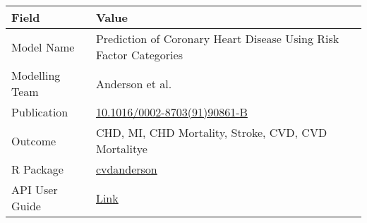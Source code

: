 \documentclass[
]{book}
\begin{document}
\begin{longtable}[]{@{}ll@{}}
\toprule
\begin{minipage}[b]{0.45\columnwidth}\raggedright
Field\strut
\end{minipage} & \begin{minipage}[b]{0.49\columnwidth}\raggedright
Value\strut
\end{minipage}\tabularnewline
\midrule
\endhead
\begin{minipage}[t]{0.45\columnwidth}\raggedright
Model Name\strut
\end{minipage} & \begin{minipage}[t]{0.49\columnwidth}\raggedright
Prediction of Coronary Heart Disease Using Risk Factor Categories\strut
\end{minipage}\tabularnewline
\begin{minipage}[t]{0.45\columnwidth}\raggedright
Modelling Team\strut
\end{minipage} & \begin{minipage}[t]{0.49\columnwidth}\raggedright
Anderson et al.\strut
\end{minipage}\tabularnewline
\begin{minipage}[t]{0.45\columnwidth}\raggedright
Publication\strut
\end{minipage} & \begin{minipage}[t]{0.49\columnwidth}\raggedright
\href{https://doi.org/10.1016/0002-8703(91)90861-B}{10.1016/0002-8703(91)90861-B}\strut
\end{minipage}\tabularnewline
\begin{minipage}[t]{0.45\columnwidth}\raggedright
Outcome\strut
\end{minipage} & \begin{minipage}[t]{0.49\columnwidth}\raggedright
CHD, MI, CHD Mortality, Stroke, CVD, CVD Mortalitye\strut
\end{minipage}\tabularnewline
\begin{minipage}[t]{0.45\columnwidth}\raggedright
R Package\strut
\end{minipage} & \begin{minipage}[t]{0.49\columnwidth}\raggedright
\href{https://github.com/resplab/cvdanderson}{cvdanderson}\strut
\end{minipage}\tabularnewline
\begin{minipage}[t]{0.45\columnwidth}\raggedright
API User Guide\strut
\end{minipage} & \begin{minipage}[t]{0.49\columnwidth}\raggedright
\href{https://resplab.github.io/prismguide/api-users-guide.html\#cvdanderson}{Link}\strut
\end{minipage}\tabularnewline
\bottomrule
\end{longtable}
\end{document}
